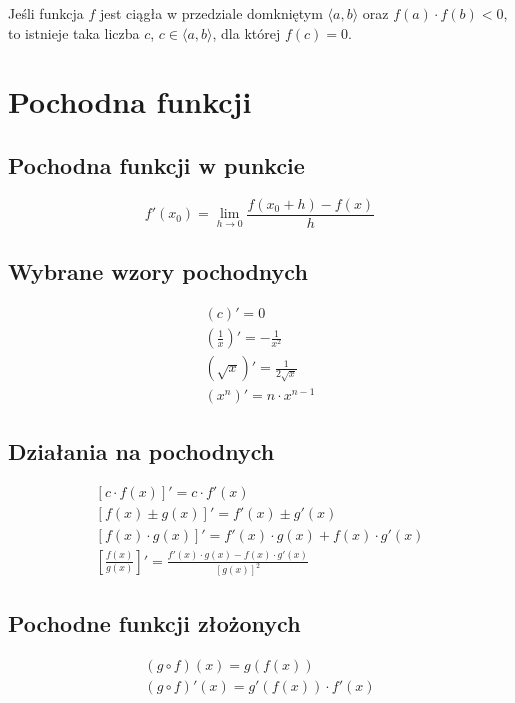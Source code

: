 \begin{theorem}
  Jeśli funkcja $f$ jest ciągła w przedziale domkniętym $\langle a, b\rangle$ oraz $f(a) \cdot f(b) < 0$,
  to istnieje taka liczba $c$, $c \in \langle a, b\rangle$, dla której $f(c) = 0$.
\end{theorem}

\section{Pochodna funkcji}
\subsection{Pochodna funkcji w punkcie}
\begin{equation*}
  f'(x_0) = \lim_{h \to 0} \frac{f(x_0 + h) - f(x)}{h}
\end{equation*}

\subsection{Wybrane wzory pochodnych}
\begin{gather*}
  (c)' = 0\\
  \left(\frac 1 x\right)' = -\frac{1}{x^2}\\
  \left(\sqrt x\right)' = \frac{1}{2 \sqrt x}\\
  \left(x^n\right)' = n \cdot x^{n-1}
\end{gather*}

\subsection{Działania na pochodnych}
\begin{gather*}
  \left[c \cdot f(x)\right]' = c \cdot f'(x)\\
  \left[f(x) \pm g(x)\right]' = f'(x) \pm g'(x)\\
  \left[f(x) \cdot g(x)\right]' = f'(x) \cdot g(x) + f(x) \cdot g'(x)\\
  \left[\frac{f(x)}{g(x)}\right]' = \frac{f'(x) \cdot g(x) - f(x) \cdot  g'(x)}{\left[g(x)\right]^2}
\end{gather*}

\subsection{Pochodne funkcji złożonych}
\begin{gather*}
  (g \circ f)(x) = g(f(x))\\
  (g \circ f)'(x) = g'(f(x)) \cdot f'(x)
\end{gather*}

